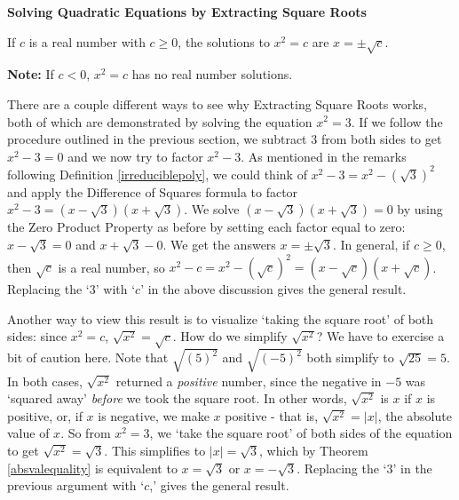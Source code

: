 \documentclass{ximera}
\begin{document}

\centerline{\textbf{Solving Quadratic Equations by Extracting Square Roots}}
\vspace{.05in}
If $c$ is a real number with $c \geq 0$, the solutions to $x^2 = c$ are $x = \pm \sqrt{c}$.

\vspace{.05in}
\textbf{Note:}  If $c < 0$, $x^2 = c$ has no real number solutions.


\medskip

There are a couple different ways to see why Extracting Square Roots works, both of which are demonstrated by solving the equation $x^2 = 3$.  If we follow the procedure outlined in the previous section, we subtract $3$ from both sides to get $x^2 - 3 = 0$ and we now try to factor $x^2 - 3$.   As mentioned in the remarks following Definition \ref{irreduciblepoly}, we could think of $x^2 - 3 = x^2 - (\sqrt{3})^2$ and apply the Difference of Squares formula to factor $x^2 - 3 = (x-\sqrt{3})(x+\sqrt{3})$.  We solve $(x-\sqrt{3})(x+\sqrt{3}) = 0$ by using the Zero Product Property as before by setting each factor equal to zero:  $x - \sqrt{3} = 0$ and $x+\sqrt{3} - 0$.  We get the answers $x = \pm \sqrt{3}$.  In general,  if $c \geq 0$, then $\sqrt{c}$ is a real number, so  $x^2 - c = x^2 - (\sqrt{c})^2 = (x-\sqrt{c})(x+\sqrt{c})$.  Replacing the `$3$' with `$c$' in the above discussion gives the general result. 

\smallskip

Another way to view this result is to visualize  `taking the square root' of both sides:   since $x^2 = c$,  $\sqrt{x^2} = \sqrt{c}$.  How do we simplify $\sqrt{x^2}$? We have to exercise a bit of caution here.  Note that $\sqrt{(5)^2}$ and $\sqrt{(-5)^2}$ both simplify to  $\sqrt{25} = 5$.  In both cases, $\sqrt{x^2}$ returned a \textit{positive} number, since the negative in $-5$ was `squared away' \textit{before} we took the square root.  In other words, $\sqrt{x^2}$ is $x$ if $x$ is positive, or, if $x$ is negative, we make $x$ positive - that is, $\sqrt{x^2} = |x|$, the absolute value of $x$.  So from $x^2 = 3$, we `take the square root' of both sides of the equation to get $\sqrt{x^2} = \sqrt{3}$.  This simplifies to $|x| = \sqrt{3}$, which by Theorem \ref{absvalequality} is equivalent to $x = \sqrt{3}$ or $x = -\sqrt{3}$.  Replacing the `$3$' in the previous argument with `$c$,' gives the general result.

\smallskip
\end{document}
